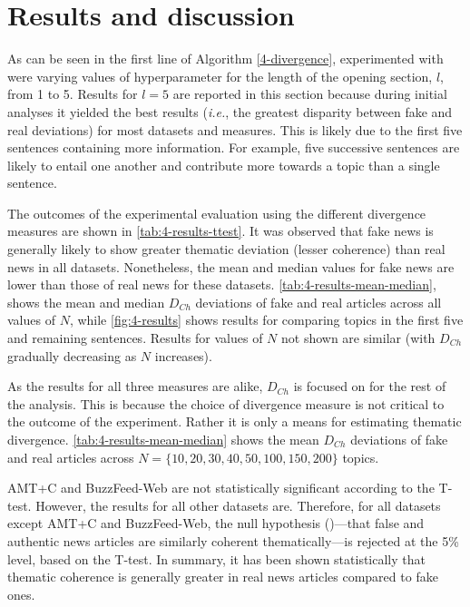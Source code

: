 \section{Results and discussion}
\label{sec:4-results-discussion}

As can be seen in the first line of Algorithm \autoref{4-divergence}, experimented with were varying values of hyperparameter for the length of the opening section, $l$, from 1 to 5. Results for $l=5$ are reported in this section because during initial analyses it yielded the best results (\emph{i.e.}, the greatest disparity between fake and real deviations) for most datasets and measures. This is likely due to the first five sentences containing more information. For example, five successive sentences are likely to entail one another and contribute more towards a topic than a single sentence.

The outcomes of the experimental evaluation using the different divergence measures are shown in \autoref{tab:4-results-ttest}. It was observed that fake news is generally likely to show greater thematic deviation (lesser coherence) than real news in all datasets. Nonetheless, the mean and median values for fake news are lower than those of real news for these datasets. \autoref{tab:4-results-mean-median}, shows the mean and median $D_{Ch}$ deviations of fake and real articles across all values of $N$, while \autoref{fig:4-results} shows results for comparing topics in the first five and remaining sentences. Results for values of $N$ not shown are similar (with $D_{Ch}$ gradually decreasing as $N$ increases).

As the results for all three measures are alike, $D_{Ch}$ is focused on for the rest of the analysis. This is because the choice of divergence measure is not critical to the outcome of the experiment. Rather it is only a means for estimating thematic divergence. \autoref{tab:4-results-mean-median} shows the mean $D_{Ch}$ deviations of fake and real articles across $N = \{ 10, 20, 30, 40, 50, 100, 150, 200 \} $ topics.

AMT+C and BuzzFeed-Web are not statistically significant according to the T-test. However, the results for all other datasets are. Therefore, for all datasets except AMT+C and BuzzFeed-Web, the null hypothesis ()—that false and authentic news articles are similarly coherent thematically—is rejected at the 5\% level, based on the T-test. In summary, it has been shown statistically that thematic coherence is generally greater in real news articles compared to fake ones.

